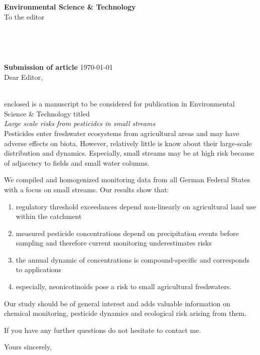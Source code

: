 \documentclass[11pt,a4paper]{letter} %
\def\opening#1{
\thispagestyle{empty}
{\centering\fromaddress \vspace{0.5in} \\} 
{\raggedright \toname \\ \toaddress \par} %
\vspace{3em}
\noindent
\textbf{Submission of article} \hspace*{\fill}\today \\[2em]
\vspace{0.6in} %
\noindent #1 %
}
\begin{document}

\begin{letter}
{
\textbf{Environmental Science \& Technology} \\
\vspace{1em}
To the editor
}

\setlength\parindent{0pt}




\opening{Dear Editor,}
\vspace{-2em}\\
enclosed is a manuscript to be considered for publication in Environmental Science \& Technology titled \\[-1em]

\emph{Large scale risks from pesticides in small streams}\\[-1em]

Pesticides enter freshwater ecosystems from agricultural areas and may have adverse effects on biota.
However, relatively little is know about their large-scale distribution and dynamics.
Especially, small streams may be at high risk because of adjacency to fields and small water columns. 

We compiled and homogenized monitoring data from all German Federal States with a focus on small streams. 
Our results show that:
\begin{enumerate} 
\item regulatory threshold exceedances depend non-linearly on agricultural land use within the catchment
\item measured pesticide concentrations depend on precipitation events before sampling and therefore current monitoring underestimates risks
\item the annual dynamic of concentrations is compound-specific and corresponds to applications
\item especially, neonicotinoids pose a risk to small agricultural freshwaters.
\end{enumerate}

Our study should be of general interest and adds valuable information on chemical monitoring, pesticide dynamics and ecological risk arising from them.


If you have any further questions do not hesitate to contact me.

\closing{Yours sincerely, }


\end{letter}
\end{document}
